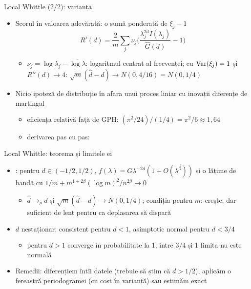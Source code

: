 \begin{frame}{Local Whittle (2/2): varianța}
\itemsize{\small}
\begin{itemize}
    \item Scorul în valoarea adevărată: o sumă ponderată de $\xi_j - 1$
    \[ R'(d) = \frac{2}{m}\sum_j\nu_j\Big(\frac{\lambda_j^{2d}I(\lambda_j)}{\hat G(d)} - 1\Big) \]
    \begin{itemize}
        \item $\nu_j = \log\lambda_j - \overline{\log\lambda}$: logaritmul centrat al frecvenței; cu $\text{Var}(\xi_j) = 1$ și $R''(d) \to 4$: $\sqrt m(\hat d - d) \to N(0, 4/16) = N(0, 1/4)$
    \end{itemize}
    \item Nicio ipoteză de distribuție în afara unui proces liniar cu inovații diferențe de martingal
    \begin{itemize}
        \item eficiența relativă față de GPH: $(\pi^2/24)/(1/4) = \pi^2/6 \approx 1{,}64$
        \item derivarea pas cu pas:   %
    \end{itemize}
\end{itemize}
\end{frame}

\begin{frame}{Local Whittle: teorema și limitele ei}
\itemsize{\small}
\begin{itemize}
    \item {}: pentru $d \in (-1/2, 1/2)$, $f(\lambda) = G\lambda^{-2d}(1 + O(\lambda^\beta))$ și o lățime de bandă cu $1/m + m^{1+2\beta}(\log m)^2/n^{2\beta} \to 0$
    \begin{itemize}
        \item $\hat d \to_p d$ și $\sqrt m(\hat d - d) \to N(0, 1/4)$; condiția pentru $m$: crește, dar suficient de lent pentru ca deplasarea să dispară
    \end{itemize}
    \item $d$ nestaționar: consistent pentru $d < 1$, asimptotic normal pentru $d < 3/4$ 
    \begin{itemize}
        \item pentru $d > 1$ converge în probabilitate la 1; între $3/4$ și 1 limita nu este normală 
    \end{itemize}
    \item Remedii: diferențiem întîi datele (trebuie să știm că $d > 1/2$), aplicăm o fereastră periodogramei (cu cost în varianță) sau estimăm exact
\end{itemize}
\end{frame}

